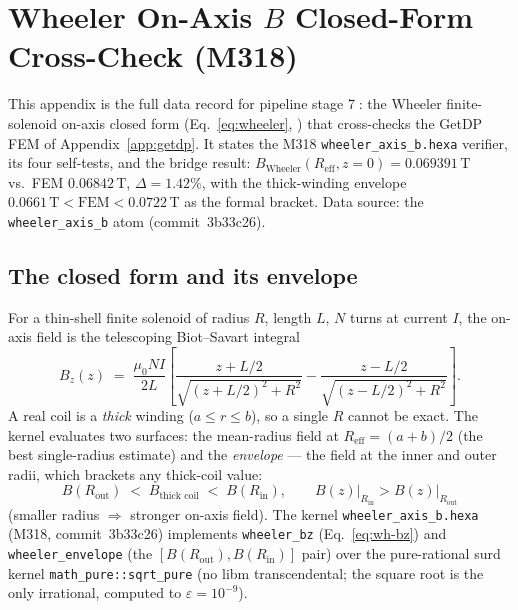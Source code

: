 \section{Wheeler On-Axis $B$ Closed-Form Cross-Check (M318)}
\label{app:wheeler}

This appendix is the full data record for pipeline stage
\textcircled{\scriptsize 7}: the Wheeler finite-solenoid on-axis closed
form (Eq.~\eqref{eq:wheeler}, \citep{jackson1999}) that cross-checks the
GetDP FEM of Appendix~\ref{app:getdp}. It states the M318
\texttt{wheeler\_axis\_b.hexa} verifier, its four self-tests, and the
bridge result: $B_{\text{Wheeler}}(R_{\text{eff}},z\!=\!0)\!=\!0.069391$\,T
vs.\ FEM $0.06842$\,T, $\Delta\!=\!1.42\%$, with the thick-winding envelope
$0.0661\,\text{T}\!<\!\text{FEM}\!<\!0.0722$\,T as the formal bracket.
Data source: the \texttt{wheeler\_axis\_b} atom (commit~3b33c26).

\subsection{The closed form and its envelope}
\label{app:wh-form}

For a thin-shell finite solenoid of radius $R$, length $L$, $N$ turns at
current $I$, the on-axis field is the telescoping Biot--Savart integral
\citep{jackson1999}
\begin{equation}
B_z(z) \;=\; \frac{\mu_0 N I}{2L}
  \left[\frac{z+L/2}{\sqrt{(z+L/2)^2+R^2}}
      - \frac{z-L/2}{\sqrt{(z-L/2)^2+R^2}}\right].
\label{eq:wh-bz}
\end{equation}
A real coil is a \emph{thick} winding ($a\!\le\!r\!\le\!b$), so a single
$R$ cannot be exact. The kernel evaluates two surfaces: the mean-radius
field at $R_{\text{eff}}=(a+b)/2$ (the best single-radius estimate) and the
\emph{envelope} --- the field at the inner and outer radii, which brackets
any thick-coil value:
\begin{equation}
B(R_{\text{out}})
  \;<\;
  B_{\text{thick coil}}
  \;<\;
  B(R_{\text{in}}),
\qquad
B(z)\big|_{R_{\text{in}}}\!>\!B(z)\big|_{R_{\text{out}}}
\label{eq:wh-envelope}
\end{equation}
(smaller radius $\Rightarrow$ stronger on-axis field). The kernel
\texttt{wheeler\_axis\_b.hexa} (M318, commit~3b33c26) implements
\texttt{wheeler\_bz} (Eq.~\ref{eq:wh-bz}) and \texttt{wheeler\_envelope}
(the $[B(R_{\text{out}}),B(R_{\text{in}})]$ pair) over the pure-rational
surd kernel \texttt{math\_pure::sqrt\_pure} (no libm transcendental; the
square root is the only irrational, computed to $\varepsilon=10^{-9}$).

